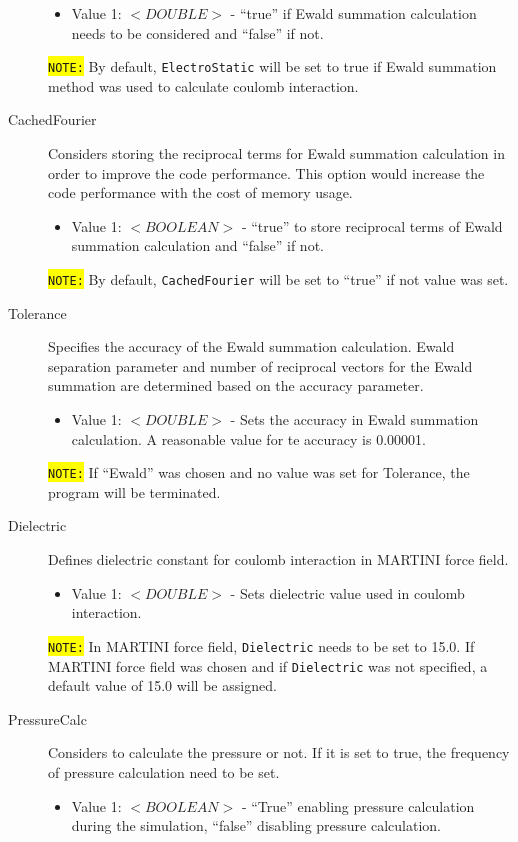 \begin{description}
	\begin{itemize}
	\item Value 1: $<DOUBLE>$ - ``true'' if Ewald summation calculation needs to be considered and ``false'' if not.
	\end{itemize}
	\colorbox{yellow}{\texttt{NOTE:}} By default, \texttt{ElectroStatic} will be set to true if Ewald summation method was used to calculate coulomb interaction.
\item [CachedFourier] Considers storing the reciprocal terms for Ewald summation calculation in order to improve the code performance. This option would increase the code performance with the cost of memory usage.
	\begin{itemize}
	\item Value 1: $<BOOLEAN>$ - ``true'' to store reciprocal terms of Ewald summation calculation and ``false'' if not.
	\end{itemize}
	\colorbox{yellow}{\texttt{NOTE:}} By default, \texttt{CachedFourier} will be set to ``true'' if not value was set.
\item [Tolerance] Specifies the accuracy of the Ewald summation calculation. Ewald separation parameter and number of reciprocal vectors for the Ewald summation are determined based on the accuracy parameter.
	\begin{itemize}
	\item Value 1: $<DOUBLE>$ - Sets the accuracy in Ewald summation calculation. A reasonable value for te accuracy is 0.00001.
	\end{itemize}
	\colorbox{yellow}{\texttt{NOTE:}} If ``Ewald'' was chosen and no value was set for Tolerance, the program will be terminated.
\item [Dielectric] Defines dielectric constant for coulomb interaction in MARTINI force field.
	\begin{itemize}
	\item Value 1: $<DOUBLE>$ - Sets dielectric value used in coulomb interaction.
	\end{itemize}
	\colorbox{yellow}{\texttt{NOTE:}} In MARTINI force field, \texttt{Dielectric} needs to be set to 15.0. If MARTINI force field was chosen and if \texttt{Dielectric} was not specified, a default value of 15.0 will be assigned.
\item [PressureCalc] Considers to calculate the pressure or not. If it is set to true, the frequency of pressure calculation need to be set.
	\begin{itemize}
	\item Value 1: $<BOOLEAN>$ - ``True'' enabling pressure calculation during the simulation, ``false'' disabling pressure calculation.

\end{itemize}
\end{description}

